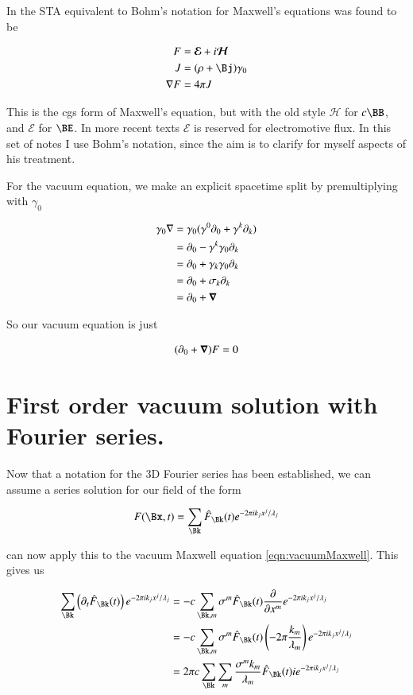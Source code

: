 \documentclass{article}
\newcommand{\EE}[0]{\boldsymbol{\mathcal{E}}}
\newcommand{\HH}[0]{\boldsymbol{\mathcal{H}}}
\begin{document}
In \cite{PJrayleighJeans} the STA equivalent to Bohm's notation 
for Maxwell's equations was found to be

\begin{align}
F &= \EE + i\HH \\
J &= (\rho + \Bj) \gamma_0 \\
\grad F &= 4 \pi J
\end{align}

This is the cgs form of Maxwell's equation, but with the old style $\HH$ for $c\BB$, and $\EE$ for $\BE$.  In more recent texts $\EE$ is reserved for electromotive flux.  In this set of notes I use Bohm's notation, since the aim is to clarify for myself aspects of his treatment.

For the vacuum equation, we make an explicit spacetime split by premultiplying with $\gamma_0$

\begin{align*}
\gamma_0 \nabla 
&= \gamma_0 (\gamma^0 \partial_0 + \gamma^k \partial_k) \\
&= \partial_0 - \gamma^k \gamma_0 \partial_k \\
&= \partial_0 + \gamma_k \gamma_0 \partial_k \\
&= \partial_0 + \sigma_k \partial_k \\
&= \partial_0 + \boldsymbol{\nabla} \\
\end{align*}

So our vacuum equation is just

\begin{align}\label{eqn:vacuumMaxwell}
(\partial_0 + \boldsymbol{\nabla}) F = 0
\end{align}

\section{ First order vacuum solution with Fourier series. }

Now that a notation for the 3D Fourier series has been established, we
can assume a series solution for our field of the form

\begin{align}\label{eqn:assumed}
F(\Bx,t) = \sum_{\Bk} \hat{F}_{\Bk}(t) e^{-2\pi i k_j x^j/\lambda_j}
\end{align}

can now apply this to the vacuum Maxwell equation \ref{eqn:vacuumMaxwell}.
This gives us

\begin{align*}
\sum_{\Bk} \left(\partial_t \hat{F}_{\Bk}(t) \right) e^{-2\pi i k_j x^j/\lambda_j}
&= -c \sum_{\Bk, m} \sigma^m \hat{F}_{\Bk}(t) \PD{x^m}{} e^{-2\pi i k_j x^j/\lambda_j} \\
&= -c \sum_{\Bk, m} \sigma^m \hat{F}_{\Bk}(t) \left(-2 \pi \frac{k_m}{\lambda_m}\right) e^{-2\pi i k_j x^j/\lambda_j} \\
&= 2 \pi c \sum_{\Bk} \sum_m \frac{\sigma^m k_m}{\lambda_m} \hat{F}_{\Bk}(t) i e^{-2\pi i k_j x^j/\lambda_j} \\
\end{align*}
\end{document}

